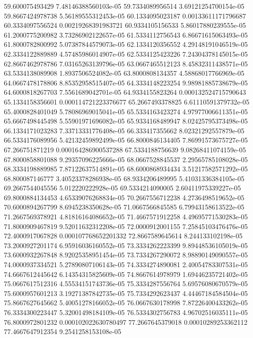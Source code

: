 {59.600075493429 7.48146388560103e-05
59.7334089956514 3.69121254700154e-05
59.8667424978738 5.56189555312453e-05
60.1334095023187 0.00133611171796687
60.3334097556524 0.00219268391983721
60.9334105156533 5.86017880239555e-05
61.2000775200982 3.73286902122657e-05
61.5334112756543 6.86671615063493e-05
61.8000782800992 5.07387844579073e-05
62.1334120356552 4.29148191046519e-05
62.3334122889889 4.57485986014907e-05
62.5334125423226 7.24304378145015e-05
62.8667462978786 7.03165263139796e-05
63.0667465512123 8.45832311438571e-05
63.5334138089908 1.8937506524082e-05
63.8000808134357 4.58868017766969e-05
64.0667478178806 8.85352958515407e-05
64.3334148223254 9.98981885738679e-05
64.6000818267703 7.5561689042701e-05
64.9334155823264 0.000132524715790643
65.1334158356601 0.000114721223376677
65.2667493378825 6.61110591379732e-05
65.4000828401049 5.78086969015041e-05
65.5334163423274 4.97977006611351e-05
65.6667498445498 5.55901971696082e-05
65.9334168489947 8.02425795373498e-05
66.1334171023283 7.33713331776408e-05
66.333417355662 8.02321292557879e-05
66.5334176089956 5.42132459892499e-05
66.8000846134405 7.86991573675727e-05
67.266751871219 0.000164286900537288
67.5334188756639 9.08268411074159e-05
67.8000858801088 9.29357096225666e-05
68.0667528845537 2.29565785108028e-05
68.3334198889985 7.87122637514891e-05
68.6000868934434 3.51217582571292e-05
68.800087146777 3.40523378286938e-05
68.9334206489995 5.41031336384105e-05
69.2667544045556 5.012220222928e-05
69.5334214090005 2.60411975339227e-05
69.8000884134453 4.65339076268834e-05
70.2667556712238 4.2736498519652e-05
70.6000894267799 8.6945238350628e-05
71.0667566845585 6.79943158613522e-05
71.2667569378921 4.81816164086652e-05
71.4667571912258 4.49695771530283e-05
71.8000909467819 9.52011632312208e-05
72.0000912001155 7.25845103476476e-05
72.4000917067828 0.000107768652201332
72.8667589645614 8.244133102198e-05
73.2000927201174 6.95916036160552e-05
73.3334262223399 9.89448536105019e-05
73.6000932267848 8.92025358951454e-05
73.7334267290072 8.98890149090557e-05
74.0000937334521 5.27890807106143e-05
74.3334274890081 2.40054783307531e-05
74.6667612445642 6.14354315825609e-05
74.8667614978979 1.69446235721402e-05
75.0667617512316 4.55534151743736e-05
75.3334287556764 5.69576080670579e-05
75.6000957601213 3.19271387842735e-05
75.7334292623437 4.44467184584504e-05
75.8667627645662 5.40051278166052e-05
76.0667630178998 7.87226400433262e-05
76.3334300223447 5.32001498184109e-05
76.5334302756783 4.96702516035111e-05
76.8000972801232 0.000102022630780497
77.2667645379018 0.00010289253362112
77.4667647912354 9.2541258153108e-05
}
